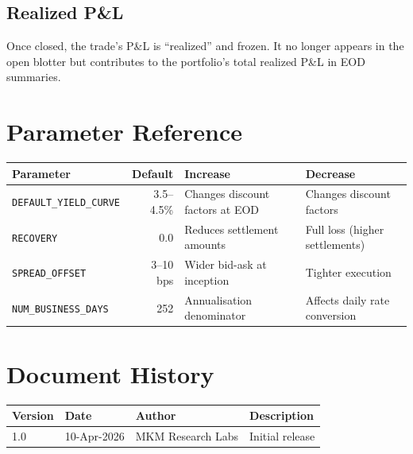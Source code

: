 \documentclass[11pt,a4paper]{article}
\begin{document}
\subsection{Realized P\&L}

Once closed, the trade's P\&L is ``realized'' and frozen.  It no longer
appears in the open blotter but contributes to the portfolio's total
realized P\&L in EOD summaries.


\section{Parameter Reference}
\label{ch:reference}

\begin{longtable}{p{4.5cm}rp{3.5cm}p{3.5cm}}
\toprule
\textbf{Parameter} & \textbf{Default} & \textbf{Increase} & \textbf{Decrease} \\
\midrule
\texttt{DEFAULT\_YIELD\_CURVE} & 3.5--4.5\% &
  Changes discount factors at EOD &
  Changes discount factors \\[4pt]
\texttt{RECOVERY} & 0.0 &
  Reduces settlement amounts &
  Full loss (higher settlements) \\[4pt]
\texttt{SPREAD\_OFFSET} & 3--10 bps &
  Wider bid-ask at inception &
  Tighter execution \\[4pt]
\texttt{NUM\_BUSINESS\_DAYS} & 252 &
  Annualisation denominator &
  Affects daily rate conversion \\
\bottomrule
\end{longtable}


\section*{Document History}

\begin{tabular}{llll}
\toprule
\textbf{Version} & \textbf{Date} & \textbf{Author} & \textbf{Description} \\
\midrule
1.0 & 10-Apr-2026 & MKM Research Labs & Initial release \\
\bottomrule
\end{tabular}
\end{document}
